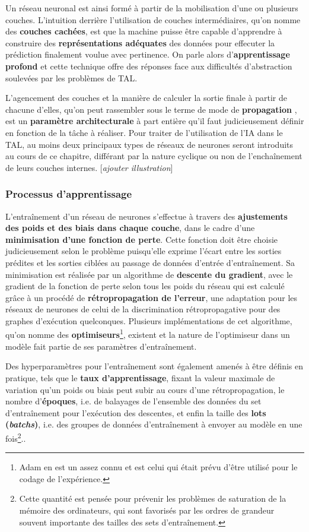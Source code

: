 \documentclass[12pt, french, twoside]{report}
\begin{document}
Un réseau neuronal est ainsi formé à partir de la mobilisation d'une ou plusieurs couches. L'intuition derrière l'utilisation de couches intermédiaires, qu'on nomme des \textbf{couches cachées}, est que la machine puisse être capable d'apprendre à construire des \textbf{représentations adéquates} des données pour effecuter la prédiction finalement voulue avec pertinence. On parle alors d'\textbf{apprentissage profond} et cette technique offre des réponses face aux difficultés d'abstraction soulevées par les problèmes de TAL.

L'agencement des couches et la manière de calculer la sortie finale à partir de chacune d'elles, qu'on peut rassembler sous le terme de \og mode de \textbf{propagation} \fg, est un \textbf{paramètre architecturale} à part entière qu'il faut judicieusement définir en fonction de la tâche à réaliser. Pour traiter de l'utilisation de l'IA dans le TAL, au moins deux principaux types de réseaux de neurones seront introduits au cours de ce chapitre, différant par la nature cyclique ou non de l'enchaînement de leurs couches internes.\cite[introduction + section 3]{jurafsky_ffnn} [\textit{ajouter illustration}]

\subsubsection{Processus d'apprentissage}
L'entraînement d'un réseau de neurones s'effectue à travers des \textbf{ajustements des poids et des biais dans chaque couche}, dans le cadre d'une \textbf{minimisation d'une fonction de perte}. Cette fonction doit être choisie judicieusement selon le problème puisqu'elle exprime l'écart entre les sorties prédites et les sorties ciblées au passage de données d'entrée d'entraînement. Sa minimisation est réalisée par un algorithme de \textbf{descente du gradient}, avec le gradient de la fonction de perte selon tous les poids du réseau qui est calculé grâce à un procédé de \textbf{rétropropagation de l'erreur}, une adaptation pour les réseaux de neurones de celui de la discrimination rétropropagative pour des graphes d'exécution quelconques. Plusieurs implémentations de cet algorithme, qu'on nomme des \textbf{optimiseurs}\footnote{Adam\cite{kingma2017adam} en est un assez connu et est celui qui était prévu d'être utilisé pour le codage de l'expérience.}, existent et la nature de l'optimiseur dans un modèle fait partie de ses paramètres d'entraînement.

Des hyperparamètres pour l'entraînement sont également amenés à être définis en pratique, tels que le \textbf{taux d'apprentissage}, fixant la valeur maximale de variation qu'un poids ou biais peut subir au cours d'une rétropropagation, le nombre d'\textbf{époques}, i.e. de balayages de l'ensemble des données du set d'entraînement pour l'exécution des descentes, et enfin la taille des \textbf{lots (\textit{batchs})}, i.e. des groupes de données d'entraînement à envoyer au modèle en une fois\footnote{Cette quantité est pensée pour prévenir les problèmes de saturation de la mémoire des ordinateurs, qui sont favorisés par les ordres de grandeur souvent importante des tailles des sets d'entraînement.}.\cite[17-23]{jurafsky_ffnn}.\cite[21]{fourrier}
\end{document}
